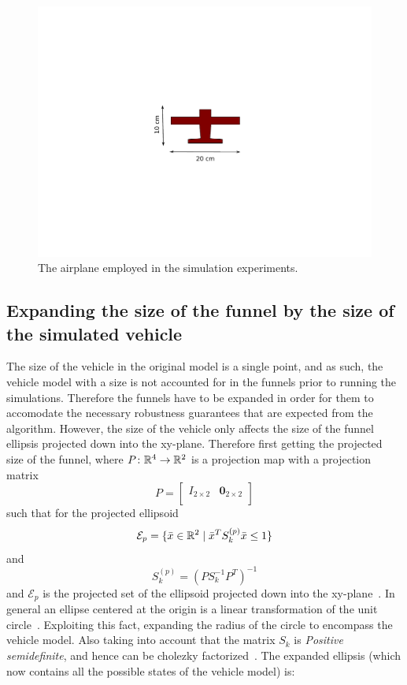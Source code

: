 \begin{figure}
  \centering \includegraphics[trim={5cm 5cm 5cm 5cm},
  width=\textwidth]{figures/experiments/radio-vehicle-model}
  \caption{The airplane employed in the simulation experiments.}
  \label{fig:radio-vehicle}
\end{figure}

\subsection{Expanding the size of the funnel by the size of the simulated
  vehicle}

The size of the vehicle in the original model is a single point, and as such,
the vehicle model with a size is not accounted for in the funnels prior to
running the simulations. Therefore the funnels have to be expanded in order for
them to accomodate the necessary robustness guarantees that are expected from
the algorithm. However, the size of the vehicle only affects the size of the
funnel ellipsis projected down into the xy-plane. Therefore first getting the
projected size of the funnel, where \(P \colon \mathbb{R}^4 \rightarrow \mathbb{R}^2\) is a
projection map with a projection matrix
\[
  P =
  \begin{bmatrix}
    I_{2 \times 2} & \mathbf{0}_{2 \times 2} \\
  \end{bmatrix}
\]
such that for the projected ellipsoid
\[
  \mathcal{E}_{p} = \lbrace\bar{x} \in \mathbb{R}^{2} \mid {\bar{x}}^{T}S_{k}^{(p)}\bar{x}
    \leq 1\rbrace
\]
and
\[
  S_{k}^{(p)} = \left( PS_{k}^{-1}P^T \right)^{-1}
\]
and \(\mathcal{E}_{p}\) is the projected set of the ellipsoid projected down
into the xy-plane~\cite{majumdarFunnelLibrariesRealtime2017}. In general an
ellipse centered at the origin is a linear transformation of the unit
circle~\cite{lay2005linear}. Exploiting this fact, expanding the radius of the
circle to encompass the vehicle model. Also taking into account that the matrix
\(S_{k}\) is \textit{Positive semidefinite}, and hence can be cholezky
factorized~\cite{lay2005linear}. The expanded ellipsis (which now contains all
the possible states of the vehicle model) is:

